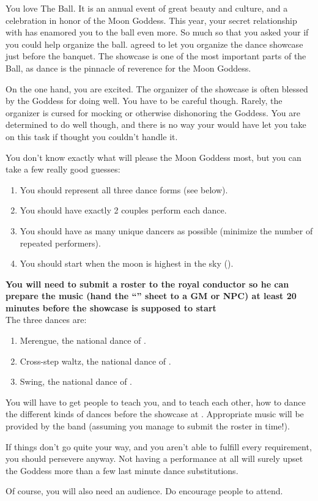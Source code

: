 \documentclass[green]{NeptuneBall}
\begin{document}
\name{\gDance{}}

You love The \cExExKing{} Ball. It is an annual event of great beauty and culture, and a celebration in honor of the Moon Goddess. This year, your secret relationship with \cDiplomat{} has enamored you to the ball even more. So much so that you asked your \cKing{\parent} if you could help organize the ball. \cKing{} agreed to let you organize the dance showcase just before the banquet. The showcase is one of the most important parts of the Ball, as dance is the pinnacle of reverence for the Moon Goddess.

On the one hand, you are excited. The organizer of the showcase is often blessed by the Goddess for doing well. You have to  be careful though. Rarely, the organizer is cursed for mocking or otherwise dishonoring the Goddess. You are determined to do well though, and there is no way your \cKing{\parent} would have let you take on this task if \cKing{\they} thought you couldn't handle it.

You don't know exactly what will please the Moon Goddess most, but you can take a few really good guesses:
\begin{enumerate}
	\item You should represent all three dance forms (see below).
	\item You should have exactly 2 couples perform each dance.
	\item You should have as many unique dancers as possible (minimize the number of repeated performers).
	\item You should start when the moon is highest in the sky (\cTOneFifty{}).
\end {enumerate}
\vspace{5mm}
{\bf You will need to submit a roster to the royal conductor so he can prepare the music (hand the ``\gRoster{}'' sheet to a GM or NPC) at least 20 minutes before the showcase is supposed to start}\\

The three dances are:
\begin{enumerate}
\item Merengue, the national dance of \pAtlantis{}.
\item Cross-step waltz, the national dance of \pPacifica{}.
\item Swing, the national dance of \pAmerica{}.
\end{enumerate}

You will have to get people to teach you, and to teach each other, how to dance the different kinds of dances before the showcase at {\bf \cTOneFifty{}}. Appropriate music will be provided by the band (assuming you manage to submit the roster in time!).

If things don't go quite your way, and you aren't able to fulfill every requirement, you should persevere anyway. Not having a performance at all will surely upset the Goddess more than a few last minute dance substitutions.

Of course, you will also need an audience. Do encourage people to attend.
\end{document}
